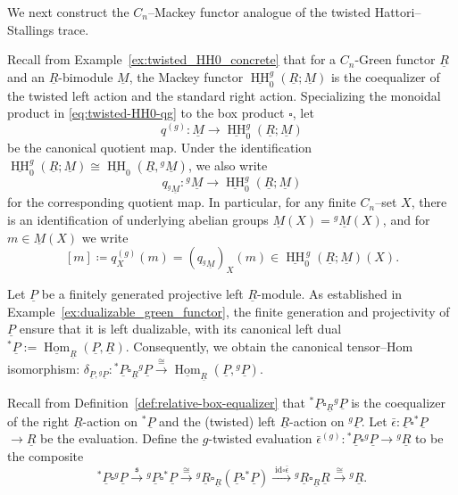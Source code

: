 \documentclass[11pt,oneside]{amsart}
\DeclareMathOperator{\Hom}{Hom}
\DeclareMathOperator{\HH}{HH}
\numberwithin{equation}{section}
\numberwithin{figure}{section}
\theoremstyle{plain}
\theoremstyle{definition}
\theoremstyle{remark}
\begin{document}
We next construct the $C_n$--Mackey functor analogue of the twisted Hattori--Stallings trace.

Recall from Example~\ref{ex:twisted_HH0_concrete} that for a $C_n$-Green functor $\underline R$ and an $\underline R$-bimodule $\underline M$, the Mackey functor $\underline{\HH}_0^g(\underline R;\underline M)$ is the coequalizer of the twisted left action and the standard right action. Specializing the monoidal product in \eqref{eq:twisted-HH0-qg} to the box product $\square$, let
\begin{equation}\label{eq:qM-g}
q^{(g)} \colon \underline{M} \longrightarrow \underline{\HH}_0^g(\underline{R};\underline{M})
\end{equation}
be the canonical quotient map. Under the identification $\underline{\HH}_0^g(\underline R;\underline M)\cong \underline{\HH}_0(\underline R,{}^{g}\underline M)$, we  also write
\begin{equation}\label{eq:qgM}
q_{{}^{g}\underline M}\colon {}^{g}\underline M \longrightarrow \underline{\HH}_0^g(\underline R;\underline M)
\end{equation}
for the corresponding quotient map. In particular, for any finite $C_n$--set $X$, there is an identification of underlying abelian groups $\underline M(X) = {}^{g}\underline M(X)$, and for $m\in \underline M(X)$ we write
$$[m]\coloneqq q^{(g)}_X(m)=(q_{{}^{g}\underline M})_X(m) \in \underline{\HH}_0^{\,g}(\underline R;\underline M)(X).$$

 


Let $\underline P$ be a finitely generated projective left $\underline R$-module. As established in Example~\ref{ex:dualizable_green_functor}, the finite generation and projectivity of $\underline P$ ensure that it is left dualizable, with its canonical left dual ${}^*\underline{P} := \underline{\Hom}_{\underline{R}}(\underline{P}, \underline{R})$. Consequently, we obtain the canonical tensor--Hom isomorphism:
\(
\delta_{\underline{P},{}^g\underline{P}} \colon {}^*\underline{P} \square_{\underline{R}} {}^g\underline{P} \xrightarrow{\cong} \underline{\Hom}_{\underline{R}}(\underline{P}, {}^g\underline{P}).\)

Recall from Definition~\ref{def:relative-box-equalizer} that ${}^{*}\underline{P}\square_{\underline R}{}^{g}\underline{P}$ is the coequalizer of the right $\underline R$-action on ${}^{*}\underline{P}$ and the (twisted) left $\underline R$-action on ${}^{g}\underline{P}$.
Let $\bar{\epsilon}\colon \underline{P}\square {}^{*}\underline{P}$
$\to \underline{R}$ be the  evaluation. Define the $g$-twisted evaluation $\bar{\epsilon}^{(g)}\colon {}^{*}\underline{P}\square {}^{g}\underline{P}\to {}^{g}\underline{R}$ to be the composite
\begin{equation}\label{eq:PgP-to-gR}{}^{*}\underline{P}\square {}^{g}\underline{P} \xrightarrow{\;\mathfrak{s}\;} {}^{g}\underline{P}\square {}^{*}\underline{P} \xrightarrow{\;\cong\;} {}^{g}\underline{R}\square_{\underline R}(\underline{P}\square {}^{*}\underline{P}) \xrightarrow{\;\mathrm{id}\square \bar{\epsilon}\;} {}^{g}\underline{R}\square_{\underline R}\underline{R} \xrightarrow{\;\cong\;} {}^{g}\underline{R}.\end{equation}
\end{document}
